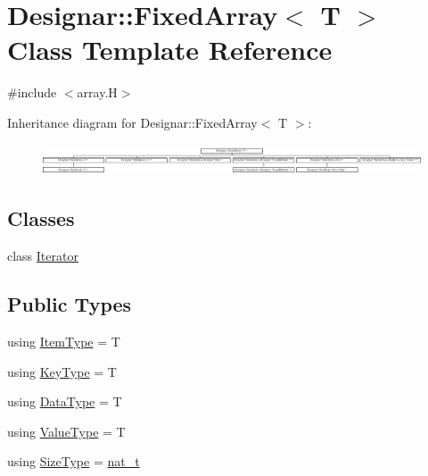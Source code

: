\hypertarget{class_designar_1_1_fixed_array}{}\section{Designar\+:\+:Fixed\+Array$<$ T $>$ Class Template Reference}
\label{class_designar_1_1_fixed_array}


{\ttfamily \#include $<$array.\+H$>$}

Inheritance diagram for Designar\+:\+:Fixed\+Array$<$ T $>$\+:\begin{figure}[H]
\begin{center}
\leavevmode
\includegraphics[height=0.924092cm]{class_designar_1_1_fixed_array}
\end{center}
\end{figure}
\subsection*{Classes}
\begin{DoxyCompactItemize}
\item 
class \hyperlink{class_designar_1_1_fixed_array_1_1_iterator}{Iterator}
\end{DoxyCompactItemize}
\subsection*{Public Types}
\begin{DoxyCompactItemize}
\item 
using \hyperlink{class_designar_1_1_fixed_array_abfeb4e683cee75ae782ad20294c4c808}{Item\+Type} = T
\item 
using \hyperlink{class_designar_1_1_fixed_array_a3a725cf21783340b8aca29dd1db0acf0}{Key\+Type} = T
\item 
using \hyperlink{class_designar_1_1_fixed_array_a3e37931b909b840cb7a40fc73f12bcf5}{Data\+Type} = T
\item 
using \hyperlink{class_designar_1_1_fixed_array_ac1cfeb4403a2dcbffd7ef494e5b873d0}{Value\+Type} = T
\item 
using \hyperlink{class_designar_1_1_fixed_array_a503ae414cc313d248e77c08e62ef043c}{Size\+Type} = \hyperlink{namespace_designar_aa72662848b9f4815e7bf31a7cf3e33d1}{nat\+\_\+t}
\end{DoxyCompactItemize}

